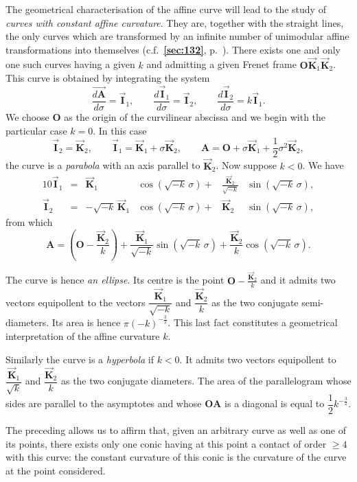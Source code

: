 \documentclass[leqno,11pt]{book}
\numberwithin{equation}{chapter}
\theoremstyle{shape1}
\theoremstyle{shapesmall}
\newcommand{\fsref}[1]{{\rm\textsection\textbf{\ref{sec:#1}}}}
\newcommand{\rvec}[1]{\vec{\mathbf{#1}}}
\newcommand{\ivec}{\rvec{I}}
\newcommand{\kvec}{\rvec{K}}
\begin{document}
The geometrical characterisation of the affine curve will lead to the study of \emph{curves with constant affine curvature}. They are, together with the straight lines, the only curves which are transformed by an infinite number of unimodular affine transformations into themselves (c.f.~\fsref{132}, p.~\pageref{sec:132}). There exists one and only one such curves having a given $k$ and admitting a given Frenet frame $\mathbf{O}\kvec_{1}\kvec_{2}$. This curve is obtained by integrating the system
\[
\frac{\overrightarrow{d\mathbf{A}}}{d\sigma}=\ivec_{1},\qquad\frac{d\ivec_{1}}{d\sigma}=\ivec_{2},\qquad\frac{d\ivec_{2}}{d\sigma}=k\ivec_{1}.
\]
We choose $\mathbf{O}$ as the origin of the curvilinear abscissa and we begin with the particular case $k=0$. In this case
\[
\ivec_{2}=\kvec_{2},\qquad\ivec_{1}=\kvec_{1}+\sigma\kvec_{2},\qquad\mathbf{A}=\mathbf{O}+\sigma\kvec_{1}+\frac{1}{2}\sigma^{2}\kvec_{2},
\]
the curve is a \emph{parabola} with an axis parallel to $\kvec_{2}$. Now suppose $k<0$. We have
\begin{alignat*}{10}
  \ivec_{1}&=&\kvec_{1}&\cos(\sqrt{-k}\,\sigma){}+{}&\frac{\kvec_{2}}{\sqrt{-k}}&\sin(\sqrt{-k}\,\sigma),\\
  \ivec_{2}&{}={}&-\sqrt{-k}\,\kvec_{1}&\cos(\sqrt{-k}\,\sigma){}+{}&\kvec_{2}&\sin(\sqrt{-k}\,\sigma),
\end{alignat*}
from which
\[
\mathbf{A}=\left(\mathbf{O}-\frac{\kvec_{2}}{k}\right)+\frac{\kvec_{1}}{\sqrt{-k}}\sin(\sqrt{-k}\,\sigma)+\frac{\kvec_{2}}{k}\cos(\sqrt{-k}\,\sigma).
\]

The curve is hence \emph{an ellipse}. Its centre is the point $\mathbf{O}-\frac{\kvec_{2}}{k}$ and it admits two vectors equipollent to the vectors $\dfrac{\kvec_{1}}{\sqrt{-k}}$ and $\dfrac{\kvec_{2}}{k}$ as the two conjugate semi-diameters. Its area is hence $\pi(-k)^{-\frac{3}{2}}$. This last fact constitutes a geometrical interpretation of the affine curvature $k$.

Similarly the curve is a \emph{hyperbola} if $k<0$. It admits two vectors equipollent to $\dfrac{\kvec_{1}}{\sqrt{k}}$ and $\dfrac{\kvec_{2}}{k}$ as the two conjugate diameters. The area of the parallelogram whose sides are parallel to the asymptotes and whose $\mathbf{OA}$ is a diagonal is equal to $\dfrac{1}{2}k^{-\frac{3}{2}}$.

The preceding allows us to affirm that, given an arbitrary curve as well as one of its points, there exists only one conic having at this point a contact of order $\ge 4$ with this curve: the constant curvature of this conic is the curvature of the curve at the point considered.
\end{document}
